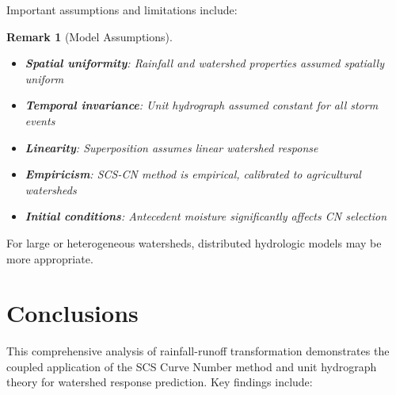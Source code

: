 \documentclass[a4paper, 11pt]{article}
\newtheorem{remark}{Remark}[section]
\begin{document}
Important assumptions and limitations include:

\begin{remark}[Model Assumptions]
\begin{itemize}
\item \textbf{Spatial uniformity}: Rainfall and watershed properties assumed spatially uniform
\item \textbf{Temporal invariance}: Unit hydrograph assumed constant for all storm events
\item \textbf{Linearity}: Superposition assumes linear watershed response
\item \textbf{Empiricism}: SCS-CN method is empirical, calibrated to agricultural watersheds
\item \textbf{Initial conditions}: Antecedent moisture significantly affects CN selection
\end{itemize}
\end{remark}

For large or heterogeneous watersheds, distributed hydrologic models may be more appropriate.

\section{Conclusions}

This comprehensive analysis of rainfall-runoff transformation demonstrates the coupled
application of the SCS Curve Number method and unit hydrograph theory for watershed response
prediction. Key findings include:
\end{document}
